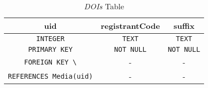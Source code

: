 \documentclass[11pt, a4paper]{article}
\begin{document}
    \begin{table}[H]
        \centering
        \begin{tabular}{|c|c|c|}
            \hline
            \textbf{uid}                        & \textbf{registrantCode} & \textbf{suffix}        \\\hline\hline
            {\lstinline|INTEGER|}               & {\lstinline|TEXT|}      & {\lstinline|TEXT|}     \\\hline
            {\lstinline|PRIMARY KEY|}           & {\lstinline|NOT NULL|}  & {\lstinline|NOT NULL|} \\
            {\lstinline|FOREIGN KEY \|}         & -                       & -                      \\
            {\lstinline|REFERENCES Media(uid)|} & -                       & -                      \\\hline
        \end{tabular}
        \caption{\textit{DOIs} Table}
        \label{tab:sqlite_table_DOIs}
    \end{table}
\end{document}
